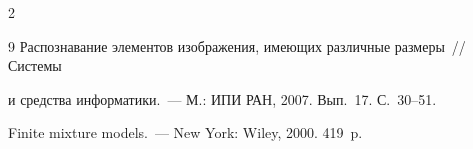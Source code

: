 \begin{multicols}{2}
{{\begin{thebibliography}{9}
Распознавание элементов изображения, имеющих различные размеры~// Системы 


и средства информатики.~--- М.: ИПИ РАН, 2007. Вып.~17. С.~30--51.





\label{end\stat}









Finite mixture models.~--- New York: Wiley, 2000.  419~p.


\end{thebibliography}


}


}


\end{multicols} 


 


 


 


